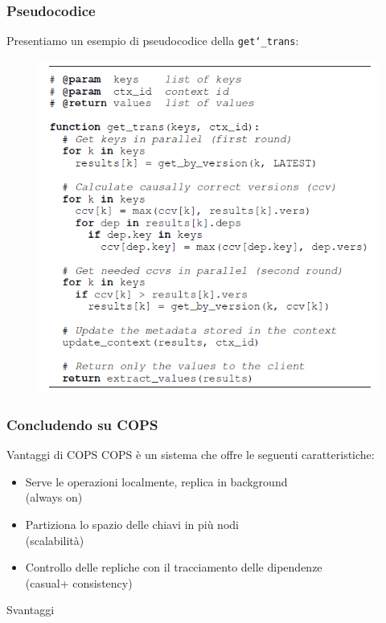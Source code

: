 \begin{frame}
\frametitle{Pseudocodice}
Presentiamo un esempio di pseudocodice della \texttt{get\char`_trans}:
\begin{figure}
	\centering
	\includegraphics[scale=0.40]{COPS/COPS5.png}
\end{figure}
\end{frame}

\begin{frame}
\frametitle{Concludendo su COPS}
\begin{block}{Vantaggi di COPS}
COPS è un sistema che offre le seguenti caratteristiche:
	\begin{itemize}
		\item<1-> Serve le operazioni localmente, replica in background \\
				  (always on)
		\item<1-> Partiziona lo spazio delle chiavi in più nodi \\
				  (scalabilità)
		\item<1-> Controllo delle repliche con il tracciamento delle dipendenze \\
				  (casual+ consistency)
	\end{itemize}
\end{block}
\begin{block}{Svantaggi}
\end{block}
\end{frame}

